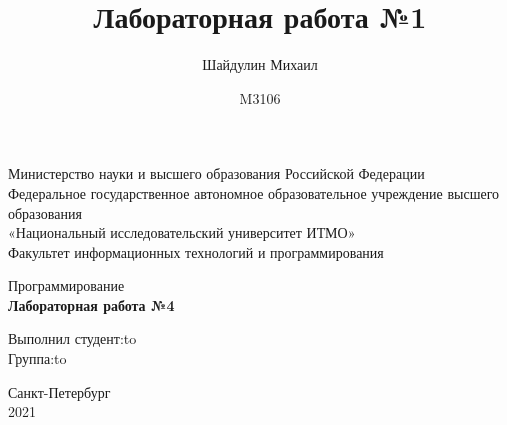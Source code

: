 \documentclass[a4paper,14pt]{article}
\author{Шайдулин Михаил}
\date{M3106}
\title{\textbf{Лабораторная работа №1}}
\begin{document}
\begin{titlepage}
\newpage

\begin{center}
Министерство науки и высшего образования Российской Федерации\\
Федеральное государственное автономное образовательное учреждение высшего образования\\
«Национальный исследовательский университет ИТМО»\\
Факультет информационных технологий и программирования\\
\end{center}

\vspace{\fill}

\begin{center}
Программирование\\
\textbf{Лабораторная работа №4}\\
\end{center}

\vspace{\fill}

\newbox{\lbox}
\newlength{\maxl}
\setlength{\maxl}{\wd\lbox}
\hfill\parbox{14cm}{
\hspace*{5cm}Выполнил студент:\hfill\hbox to\\
\hspace*{5cm}Группа:\hfill\hbox to\\
}


\vspace{8em}

\begin{center}
Санкт-Петербург \\2021
\end{center}

\end{titlepage}


\end{document}
